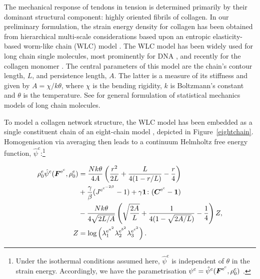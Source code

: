 The mechanical response of tendons in tension is determined primarily
by their dominant structural component: highly oriented fibrils of
collagen. In our preliminary formulation, the strain energy density
for collagen has been obtained from hierarchical multi-scale
considerations based upon an entropic elasticity-based worm-like chain
(WLC) model \citep{KratkyPorod:49}. The WLC model has been widely used
for long chain single molecules, most prominently for DNA
\citep{MarkoSiggia:95,Riefetal:97,Bustamanteetal:2003}, and recently
for the collagen mono\-mer \citep{Sunetal:2002}. The central
parameters of this model are the chain's contour length, $L$, and
persistence length, $A$. The latter is a measure of its stiffness and
given by $A = \chi/k\theta$, where $\chi$ is the bending rigidity, $k$
is Boltzmann's constant and $\theta$ is the temperature. See
\citet{LandLif} for general formulation of statistical mechanics
models of long chain molecules. 

To model a collagen network structure, the
WLC model has been embedded as a single constituent chain of an
eight-chain model \citep{Bischoffetal:2002, Bischoffetal1:2002},
depicted in \mbox{Figure~\ref{eightchain}}.  Homogenisation via
averaging then leads to a continuum Helmholtz free energy function,
$\hat{\psi}^\mathrm{c}$:\footnote{Under the isothermal conditions
  assumed here, $\hat{\psi}^\mathrm{c}$ is independent of
  $\theta$ in the 
  strain energy. Accordingly, we have the parametrisation
  ${\psi}^\mathrm{c}=\hat{\psi}^\mathrm{c}
  (\mbox{\boldmath$ F$}^{\mathrm{e}^\mathrm{c}},\rho^\mathrm{c}_{0})$ .}

\begin{equation}
\begin{split}
\rho^\mathrm{c}_{0}\hat{\psi}^\mathrm{c} (\mbox{\boldmath$ F$}^{\mathrm{e}^\mathrm{c}},\rho^\mathrm{c}_{0})
&= \frac{N k \theta}{4 A}\left(\frac{r^2}{2L} + \frac{L}{4(1-r/L)} -
\frac{r}{4}\right)\\ & +
\frac{\gamma}{\beta}({J^{\mathrm{e}^{\mathrm{c}^{-2\beta}}}} -1) +
\gamma{\bf 1}\colon(\mbox{\boldmath$ C$}^{\mathrm{e}^{\mathrm{c}}}-{\bf 1})\\ &-\frac{N
k \theta}{4\sqrt{2L/A}}\left(\sqrt{\frac{2A}{L}} + \frac{1}{4(1 -
\sqrt{2A/L})} -\frac{1}{4} \right) Z,\\ Z &=
\log\left(\lambda_1^{{\mathrm{e}}^{a^\mathrm{2}}}
\lambda_2^{{\mathrm{e}}^{b^\mathrm{2}}}
\lambda_3^{{\mathrm{e}}^{c^\mathrm{2}}}\right).
\label{wlcm-energy}
\end{split}
\end{equation}

